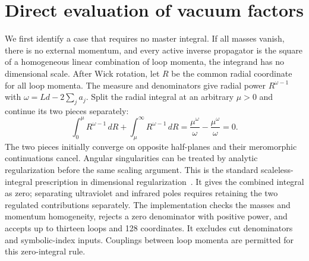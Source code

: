 \section{Direct evaluation of vacuum factors}
\label{app:direct-vacuum}
We first identify a case that requires no master integral. If all masses vanish, there is no external momentum, and every active inverse propagator is the square of a homogeneous linear combination of loop momenta, the integrand has no dimensional scale. After Wick rotation, let $R$ be the common radial coordinate for all loop momenta. The measure and denominators give radial power $R^{\omega-1}$ with $\omega=Ld-2\sum_j a_j$. Split the radial integral at an arbitrary $\mu>0$ and continue its two pieces separately:
\begin{equation}
 \int_0^\mu R^{\omega-1}\,dR+
 \int_\mu^\infty R^{\omega-1}\,dR
 =\frac{\mu^\omega}{\omega}-\frac{\mu^\omega}{\omega}=0.
 \label{eq:direct-scaleless}
\end{equation}
The two pieces initially converge on opposite half-planes and their meromorphic continuations cancel. Angular singularities can be treated by analytic regularization before the same scaling argument. This is the standard scaleless-integral prescription in dimensional regularization~\cite{Weinzierl2022}. It gives the combined integral as zero; separating ultraviolet and infrared poles requires retaining the two regulated contributions separately. The implementation checks the masses and momentum homogeneity, rejects a zero denominator with positive power, and accepts up to thirteen loops and 128 coordinates. It excludes cut denominators and symbolic-index inputs. Couplings between loop momenta are permitted for this zero-integral rule.

